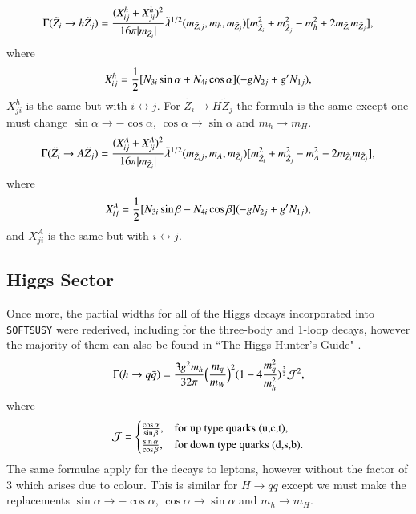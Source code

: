 \documentclass[final,3p,times]{elsarticle}
\begin{document}
\begin{equation}\label{neuthneut}
\Gamma (\tilde{Z}_i \rightarrow h \tilde{Z}_{j}) = {(X_{ij}^{h} + X_{ji}^{h})^2 \over 16\pi |m_{\tilde{Z}_i}|} \tilde{\lambda}^{1/2} (m_{\tilde{Z}_ij}, m_{h}, m_{\tilde{Z}_{j}}) [m_{\tilde{Z}_{i}}^2 + m_{\tilde{Z}_j}^2 -m_{h}^2 +2m_{\tilde{Z}_i}m_{\tilde{Z}_j}],
\end{equation} 
where
\begin{equation} \label{Xijh}
X_{ij}^{h} = {1 \over 2} [N_{3i} \sin \alpha + N_{4i}\cos \alpha] (-g N_{2j} + g' N_{1j}),
\end{equation}
$X_{ji}^{h}$ is the same but with $i \leftrightarrow j$.
For $\tilde{Z}_i \rightarrow H \tilde{Z}_j$ the formula is the same except one must change $\sin\alpha \rightarrow -\cos\alpha$, $\cos\alpha \rightarrow \sin\alpha$ and $m_h \rightarrow m_H$.
\begin{equation}\label{neutAneut}
\Gamma (\tilde{Z}_i \rightarrow A \tilde{Z}_{j}) = {(X_{ij}^{A} + X_{ji}^{A})^2 \over 16\pi |m_{\tilde{Z}_i}|} \tilde{\lambda}^{1/2} (m_{\tilde{Z}_ij}, m_{A}, m_{\tilde{Z}_{j}}) [m_{\tilde{Z}_{i}}^2 + m_{\tilde{Z}_j}^2 -m_{A}^2 -2m_{\tilde{Z}_i}m_{\tilde{Z}_j}],
\end{equation} 
where
\begin{equation} \label{XijA}
X_{ij}^{A} = {1 \over 2} [N_{3i} \sin \beta - N_{4i} \cos \beta] (-gN_{2j} + g'N_{1j}),
\end{equation}
and $X_{ji}^{A}$ is the same but with $i \leftrightarrow j$.

\subsection{Higgs Sector} \label{Higgs_Sector}

Once more, the partial widths for all of the Higgs decays incorporated into {\tt SOFTSUSY} were rederived, including for the three-body and 1-loop decays, however the majority of them can also be found in ``The Higgs Hunter's Guide" \cite{HHG}.
\begin{equation}\label{hqq}
\Gamma (h \rightarrow q \bar{q}) = {3g^2 m_h \over 32\pi} \Big({m_q \over m_W}\Big)^2 (1-4{m_q^2 \over m_h^2})^{3 \over 2} \mathcal{J}^2, 
\end{equation} 
where
\begin{equation}
\mathcal{J}=\begin{cases}
    {\cos \alpha \over \sin \beta}, & \text{for up type quarks (u,c,t)},\\
    {\sin \alpha \over \cos \beta}, & \text{for down type quarks (d,s,b)}.
  \end{cases}
\end{equation}
The same formulae apply for the decays to leptons, however without the factor of 3 which arises due to colour.
This is similar for $H \rightarrow qq$ except we must make the replacements $\sin\alpha \rightarrow -\cos\alpha$, $\cos\alpha \rightarrow \sin\alpha$ and $m_h \rightarrow m_H$.
\end{document}
